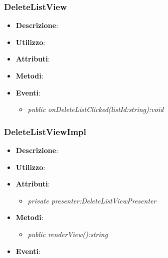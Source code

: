 \subsubsection{DeleteListView}
\begin{itemize}
\item \textbf{Descrizione}: 
\item \textbf{Utilizzo}:
\item \textbf{Attributi}: 
\item \textbf{Metodi}:
\item \textbf{Eventi}:
	\begin{itemize}
	\item \textit{public onDeleteListClicked(listId:string):void}\\

	\end{itemize}
\end{itemize}

\subsubsection{DeleteListViewImpl}
\begin{itemize}
\item \textbf{Descrizione}: 
\item \textbf{Utilizzo}:
\item \textbf{Attributi}: 
	\begin{itemize}
	\item \textit{private presenter:DeleteListViewPresenter}\\
	
	\end{itemize}
\item \textbf{Metodi}:
	\begin{itemize}
	\item \textit{public renderView():string}\\

	\end{itemize}
\item \textbf{Eventi}:
\end{itemize}

